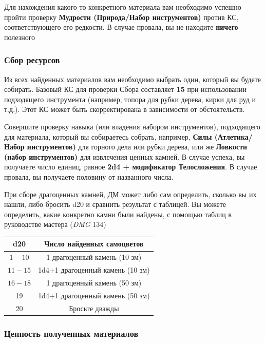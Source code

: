 \documentclass[a4paper, 9pt, twocolumn]{book}
\begin{document}
	Для нахождения какого-то конкретного материала вам необходимо успешно пройти проверку \textbf{Мудрости (Природа/Набор инструментов)} против КС, соответствующего его редкости. В случае провала, вы не находите \textbf{ничего} полезного
	
	\subsubsection{Сбор ресурсов}
	
	Из всех найденных материалов вам необходимо выбрать один, который вы будете собирать. Базовый КС для проверки Сбора составляет \textbf{15} при использовании подходящего инструмента (например, топора для рубки дерева, кирки для руд и т.д.). Этот КС может быть скорректирована в зависимости от обстоятельств.
	
	Совершите проверку навыка (или владения набором инструментов), подходящего для материала, который вы собираетесь собрать, например, \textbf{Силы (Атлетика/Набор инструментов)} для горного дела или рубки дерева, или же \textbf{Ловкости (набор инструментов)} для извлечения ценных камней. В случае успеха, вы получаете число единиц, равное \textbf{2d4 + модификатор Телосложения}. В случае провала, вы получаете половину от названного числа.
	
	При сборе драгоценных камней, ДМ может либо сам определить, сколько вы их нашли, либо бросить d20 и сравнить результат с таблицей. Вы можете определить, какие конкретно камни были найдены, с помощью таблиц в руководстве мастера (\textit{DMG} 134)
	
	\begin{tabular}{|c|c|}
		\hline
		\textbf{d20} & \textbf{Число найденных самоцветов} \\
		\hline
		$1-10$ & 1 драгоценный камень (10 зм) \\
		\hline
		$11-15$ & 1d4+1 драгоценный камень (10 зм) \\
		\hline
		$16-18$ & 1 драгоценный камень (50 зм) \\
		\hline
		19 & 1d4+1 драгоценный камень (50 зм) \\
		\hline
		20 & Бросьте дважды \\
		\hline
	\end{tabular}
	
	\subsubsection{Ценность полученных материалов}
	
\end{document}
